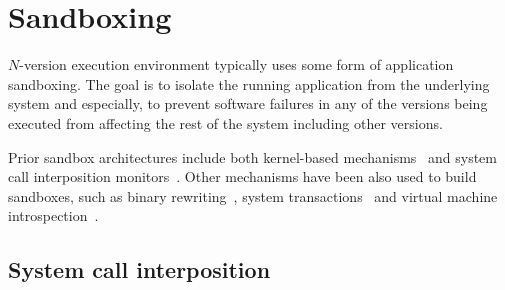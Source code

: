 \section{Sandboxing}
\label{related:sandboxing}

$N$-version execution environment typically uses some form of application
sandboxing. The goal is to isolate the running application from the underlying
system and especially, to prevent software failures in any of the versions
being executed from affecting the rest of the system including other versions.

Prior sandbox architectures include both kernel-based
mechanisms~\cite{tron,remus,subdomain,cots-hardening} and system call
interposition monitors~\cite{wily-hacker,mapbox,jain1999,provos2002,mbox}.
Other mechanisms have been also used to build sandboxes, such as binary
rewriting~\cite{vx32,true:sp12}, system transactions~\cite{txbox} and virtual
machine introspection~\cite{garfinkel:vmi}.

\subsection{System call interposition}
\label{related:syscalls}


